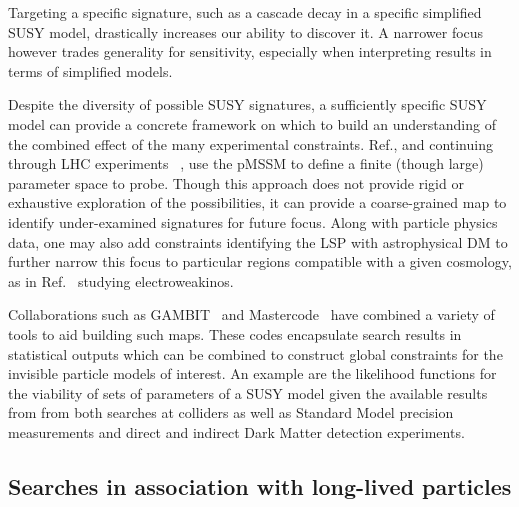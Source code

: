 
Targeting a specific signature, such as a cascade decay in a specific simplified SUSY model, drastically increases our ability to discover it. A narrower focus however trades generality for sensitivity, especially when interpreting results in terms of simplified models. 

Despite the diversity of possible SUSY signatures, a sufficiently specific SUSY model can provide a concrete framework on which to build an understanding of the combined effect of the many experimental constraints. Ref.\cite{Conley:2010du}, and continuing through LHC experiments ~\cite{Aad:2015baa, Khachatryan:2016nvf}, use the pMSSM to define a finite (though large) parameter space to probe. Though this approach does not provide rigid or exhaustive exploration of the possibilities, it can provide a coarse-grained map to identify under-examined signatures for future focus. Along with particle physics data, one may also add constraints identifying the LSP with astrophysical DM to further narrow this focus to particular regions compatible with a given cosmology, as in Ref.~\cite{Aaboud:2016wna} studying electroweakinos.

Collaborations such as GAMBIT~\cite{Athron:2017ard} and Mastercode~\cite{Bagnaschi:2017tru} have combined a variety of tools to aid building such maps. These codes encapsulate search results in statistical outputs which can be combined to construct global constraints for the invisible particle models of interest. 
An example are the likelihood functions for the viability of sets of parameters of a SUSY model given the available results from from both searches at colliders as well as Standard Model precision measurements and direct and indirect Dark Matter detection experiments.

\subsection{Searches in association with long-lived particles}
\label{sec:results_LLPSearches}


